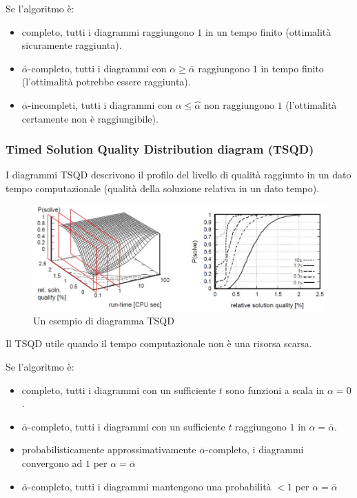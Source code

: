 \documentclass{article}
\begin{document}
Se l'algoritmo è:
\begin{itemize}
    \item completo, tutti i diagrammi raggiungono $1$ in un tempo finito (ottimalità sicuramente raggiunta).
    \item $\overline{\alpha}$-completo, tutti i diagrammi con $\alpha\geq\overline{\alpha}$
          raggiungono $1$ in tempo finito (l'ottimalità potrebbe essere raggiunta).
    \item $\overline{\alpha}$-incompleti, tutti i diagrammi con $\alpha\leq\overbrace{\alpha}$ non raggiungono $1$
          (l'ottimalità certamente non è raggiungibile).
\end{itemize}

\subsubsection{Timed Solution Quality Distribution diagram (TSQD)}
I diagrammi TSQD descrivono il profilo del livello di qualità
raggiunto in un dato tempo computazionale (qualità della soluzione relativa in un dato tempo).
\begin{figure}[H]
    \centering
    \includegraphics[scale=0.45]{images/tsqd.png}
    \caption{Un esempio di diagramma TSQD}
\end{figure}
Il TSQD utile quando il tempo computazionale non è una risorsa scarsa.

Se l'algoritmo è:
\begin{itemize}
    \item completo, tutti i diagrammi con un sufficiente $t$ sono funzioni a scala in $\alpha=0$.
    \item $\overline{\alpha}$-completo, tutti i diagrammi con un sufficiente $t$ raggiungono $1$ in $\alpha=\overline{\alpha}$.
    \item probabilisticamente approssimativamente $\overline{\alpha}$-completo, i diagrammi convergono ad $1$ per $\alpha=\overline{\alpha}$
    \item $\overline{\alpha}$-completo, tutti i diagrammi mantengono una probabilità $<1$ per $\alpha=\overline{\alpha}$
\end{itemize}
\end{document}
